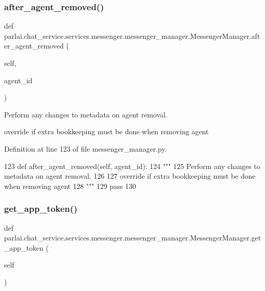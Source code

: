 \subsubsection{\texorpdfstring{after\+\_\+agent\+\_\+removed()}{after\_agent\_removed()}}
{\footnotesize\ttfamily def parlai.\+chat\+\_\+service.\+services.\+messenger.\+messenger\+\_\+manager.\+Messenger\+Manager.\+after\+\_\+agent\+\_\+removed (\begin{DoxyParamCaption}\item[{}]{self,  }\item[{}]{agent\+\_\+id }\end{DoxyParamCaption})}

\begin{DoxyVerb}Perform any changes to metadata on agent removal.

override if extra bookkeeping must be done when removing agent
\end{DoxyVerb}
 

Definition at line 123 of file messenger\+\_\+manager.\+py.


\begin{DoxyCode}
123     \textcolor{keyword}{def }after\_agent\_removed(self, agent\_id):
124         \textcolor{stringliteral}{"""}
125 \textcolor{stringliteral}{        Perform any changes to metadata on agent removal.}
126 \textcolor{stringliteral}{}
127 \textcolor{stringliteral}{        override if extra bookkeeping must be done when removing agent}
128 \textcolor{stringliteral}{        """}
129         \textcolor{keywordflow}{pass}
130 
\end{DoxyCode}
\mbox{\label{classparlai_1_1chat__service_1_1services_1_1messenger_1_1messenger__manager_1_1MessengerManager_a0fa4fe590efa528624a0965dbb995683}} 
\subsubsection{\texorpdfstring{get\+\_\+app\+\_\+token()}{get\_app\_token()}}
{\footnotesize\ttfamily def parlai.\+chat\+\_\+service.\+services.\+messenger.\+messenger\+\_\+manager.\+Messenger\+Manager.\+get\+\_\+app\+\_\+token (\begin{DoxyParamCaption}\item[{}]{self }\end{DoxyParamCaption})}

